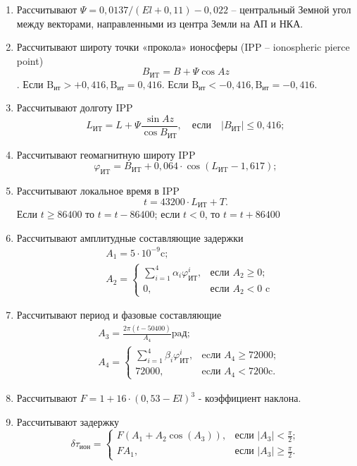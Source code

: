 \documentclass[14pt,a4paper,oneside]{extarticle}
\begin{document}
\begin{enumerate}
    \item Рассчитывают $\Psi=0,0137/(El+0,11)-0,022$ – центральный Земной угол между векторами, направленными из центра Земли на АП и НКА.
    \item Рассчитывают широту точки «прокола» ионосферы (IPP – ionospheric pierce point) \[B_\text{ИT}=B+\Psi\cos Az\]. Если $\text{B}_\text{ит}{ > + 0 , 4 1 6 , \text{B}_\text{ит}{ = 0 , 4 1 6 }}.$ Если $\text{B}_\text{ит}{ < - 0 , 4 1 6 , \text{B}_\text{ит}{ = -0 , 4 1 6 }}.$
    \item Рассчитывают долготу IPP \[L_{\text{ИТ}}=L+\Psi\frac{\sin Az}{\cos B_{\text{ИТ}}},\quad\text{если}\quad|B_{\text{ИТ}}|\leqslant0,416;\]
    \item Рассчитывают геомагнитную широту IPP \[\varphi_{\text{ИT}}=B_{\text{ИT}}+0{,}064\cdot\cos(L_{\text{ИT}}-1{,}617);\]
    \item Рассчитывают локальное время в IPP \[t=43200\cdot L_\text{ИТ}+T.\] Если $t\geq 86400$ то $t=t-86400$; если $t<0$, то $t=t+86400$
    \item Рассчитывают амплитудные составляющие задержки \[\begin{aligned}
                   & A_{1} =5\cdot10^{-9}\mathrm{c};                                                                                                                         \\
                   & A_{2} =\begin{cases}\sum\limits_{i=1}^4\alpha_i\varphi_{\text{ИТ}}^i,&\text{если }A_2\geqslant0;\\0,&\text{если }A_2<0\text{ c}\end{cases}
              \end{aligned}\]
    \item Рассчитывают период и фазовые составляющие \[\begin{aligned}
                   & A_{3} =\frac{2\pi(t-50400)}{A_{4}}\text{paд};                                                                                                                     \\
                   & A_{4} =\begin{cases}\sum\limits_{i=1}^4\beta_i\varphi_{\text{ИТ}}^i,&\text{ecли }A_4\geqslant72000;\\72000,&\text{ecли }A_4<7200\text{c}.\end{cases}
              \end{aligned}\]
    \item Рассчитывают $F=1+16\cdot(0,53-El)^3$ - коэффициент наклона.
    \item Рассчитывают задержку \[\delta\tau_{\text{ион}}=\begin{cases}F\left(A_1+A_2\cos(A_3)\right),&\text{если }|A_3|<\frac{\pi}{2};\\FA_1,&\text{если }|A_3|\geqslant\frac{\pi}{2}.\end{cases}\]
\end{enumerate}
\end{document}
